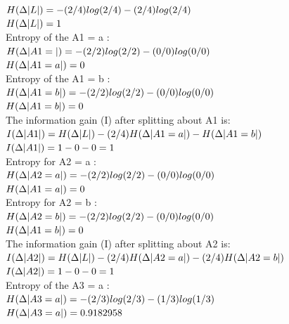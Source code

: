\documentclass[12pt]{article}
\begin{document}
\begin{enumerate}
 $H(\Delta \arrowvert L \arrowvert) = -(2/4)log(2/4)-(2/4)log(2/4)$ \\
 $H(\Delta \arrowvert L \arrowvert) = 1$ \\
 
 Entropy of the A1 = a : \\
 $H(\Delta \arrowvert A1 =  \arrowvert) = -(2/2)log(2/2)-(0/0)log(0/0)$ \\
 $H(\Delta \arrowvert A1 = a \arrowvert) = 0$ \\
 
 Entropy of the A1 = b : \\
 $H(\Delta \arrowvert A1 = b \arrowvert) = -(2/2)log(2/2)-(0/0)log(0/0)$ \\
 $H(\Delta \arrowvert A1 = b \arrowvert) = 0$ \\ 
 
The information gain (I) after splitting about A1 is: \\
 $I(\Delta \arrowvert A1 \arrowvert) = H(\Delta \arrowvert L \arrowvert)-(2/4)H(\Delta \arrowvert A1 = a \arrowvert)-H(\Delta \arrowvert A1 = b \arrowvert)$ \\
 $I(\Delta \arrowvert A1 \arrowvert) = 1-0-0 = 1$ \\
 
 Entropy for A2 = a : \\
 $H(\Delta \arrowvert A2 = a \arrowvert) = -(2/2)log(2/2)-(0/0)log(0/0)$ \\
 $H(\Delta \arrowvert A1 = a \arrowvert) = 0$ \\
 
 Entropy for A2 = b : \\
 $H(\Delta \arrowvert A2 = b \arrowvert) = -(2/2)log(2/2)-(0/0)log(0/0)$ \\
 $H(\Delta \arrowvert A1 = b \arrowvert) = 0$ \\
 
 The information gain (I) after splitting about A2 is: \\
 $I(\Delta \arrowvert A2 \arrowvert) = H(\Delta \arrowvert L \arrowvert)-(2/4)H(\Delta \arrowvert A2 = a \arrowvert)- (2/4)H(\Delta \arrowvert A2 = b \arrowvert)$ \\
 $I(\Delta \arrowvert A2 \arrowvert) = 1-0-0 = 1$ \\
 
 Entropy of the A3 = a : \\
 $H(\Delta \arrowvert A3 = a \arrowvert) = -(2/3)log(2/3)-(1/3)log(1/3)$ \\
 $H(\Delta \arrowvert A3 = a \arrowvert) = 0.9182958$ \\
 

\end{enumerate}
\end{document}
